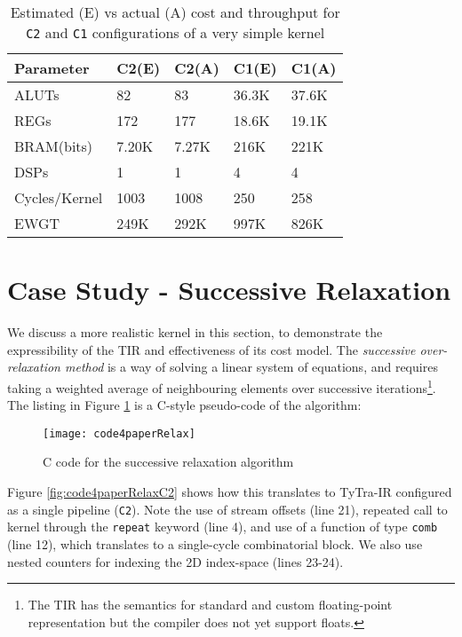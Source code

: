 \documentclass[]{heart2015_WN4Pre}
\begin{document}
\begin{table}[thb]
	\begin{tabular}{|p{14ex}|p{8ex}|p{8ex}|p{8ex}|p{8ex}|}
\hline \textbf{Parameter}& \textbf{C2(E)} & \textbf{C2(A)} & \textbf{C1(E)} & \textbf{C1(A)} \\ 
		\hline \hline ALUTs 			& 82 	& 83 	&  36.3K& 37.6K \\ 
		\hline REGs 			& 172   & 177 	&  18.6K& 19.1K \\ 
		\hline BRAM(bits) 		& 7.20K & 7.27K &  216K & 221K	\\ 
		\hline DSPs 			& 1  	& 1     &  4  	& 4 	\\ 
		\hline
		\hline Cycles/Kernel	& 1003  & 1008 	& 250 	&  258	\\ 		
		\hline EWGT       		& 249K  & 292K  &  997K & 826K 	\\ 
		\hline 
	\end{tabular} 
	\caption{Estimated (E) vs actual (A) cost and throughput for \texttt{C2} and \texttt{C1} configurations of a very simple kernel}
	\label{tab:estVactualSimple}
\end{table}

\section{Case Study - Successive Relaxation}
\label{sec:caseStudy}

We discuss a more realistic kernel in this section, to demonstrate the expressibility of the TIR  and effectiveness of its cost model. The \textit{successive over-relaxation method} is a way of solving a linear system of equations, and requires taking a weighted average of neighbouring elements over successive iterations\footnote{The TIR has the semantics for standard and custom floating-point representation but the compiler does not yet support floats.}. The listing in Figure \ref{fig:code4paperRelax} is a C-style pseudo-code of the algorithm:

\begin{figure}[th]
\centering
\texttt{[image: code4paperRelax]}
\caption{C code for the successive relaxation algorithm}
\label{fig:code4paperRelax}
\end{figure}

Figure \ref{fig:code4paperRelaxC2} shows how this translates to TyTra-IR configured as a single pipeline (\texttt{C2}). Note the use of stream offsets (line 21), repeated call to kernel through the \texttt{repeat} keyword (line 4), and use of a function of type \texttt{comb} (line 12), which translates to a single-cycle combinatorial block. We also use nested counters for indexing the 2D index-space (lines 23-24). 
\end{document}
